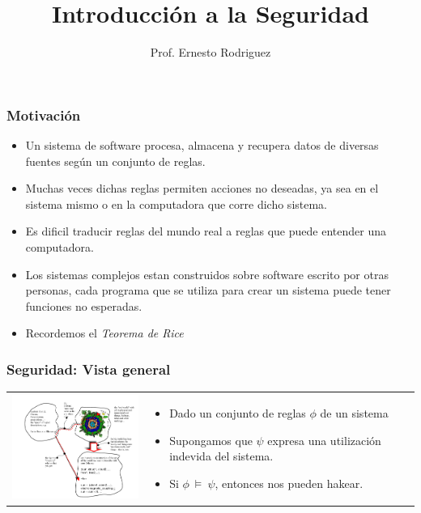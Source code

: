 \documentclass{beamer}
\title{Introducci\'on a la Seguridad}
\author{Prof. Ernesto Rodriguez}
\institute{
    Universidad del Itsmo \\
    \medskip \textit{erodriguez@unis.edu.gt}
}
\date[\today]{}
\begin{document}
\begin{frame}
\titlepage
\end{frame}

\begin{frame}
    \frametitle{Motivaci\'on}
    \begin{itemize}
        \item{Un sistema de software procesa, almacena y recupera datos
        de diversas fuentes seg\'un un conjunto de reglas.}
        \item{Muchas veces dichas reglas permiten acciones no deseadas,
        ya sea en el sistema mismo o en la computadora que corre dicho sistema.}
        \item{Es dificil traducir reglas del mundo real a reglas que puede
        entender una computadora.}
        \item{Los sistemas complejos estan construidos sobre software escrito
        por otras personas, cada programa que se utiliza para crear un sistema
        puede tener funciones no esperadas.}
        \item{Recordemos el \emph{Teorema de Rice}\cite{RiceTheorem}}
    \end{itemize}
\end{frame}

\begin{frame}
    \frametitle{Seguridad: Vista general}
    \begin{tabular}{p{6cm} p{5cm}}
        \vspace{0px}
        \includegraphics[width=6cm]{./triangulo} &
        \begin{itemize}
            \item{Dado un conjunto de reglas $\phi$ de un sistema}
            \item{Supongamos que $\psi$ expresa una utilizaci\'on indevida del sistema.}
            \item{Si $\phi\ \models\ \psi$, entonces nos pueden hakear.}
        \end{itemize}
    \end{tabular}
\end{frame}
\end{document}
